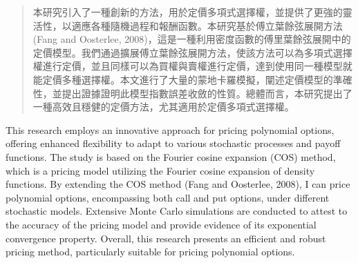 
\begin{abstract}

本研究引入了一種創新的方法，用於定價多項式選擇權，並提供了更強的靈活性，以適應各種隨機過程和報酬函數。本研究基於傅立葉餘弦展開方法 (Fang and Oosterlee, 2008)，這是一種利用密度函數的傅里葉餘弦展開中的定價模型。我們通過擴展傅立葉餘弦展開方法，使該方法可以為多項式選擇權進行定價，並且同樣可以為買權與賣權進行定價，達到使用同一種模型就能定價多種選擇權。本文進行了大量的蒙地卡羅模擬，闡述定價模型的準確性，並提出證據證明此模型指數誤差收斂的性質。總體而言，本研究提出了一種高效且穩健的定價方法，尤其適用於定價多項式選擇權。

\end{abstract}

\begin{abstract*}

This research employs an innovative approach for pricing polynomial options, offering enhanced flexibility to adapt to various stochastic processes and payoff functions. The study is based on the Fourier cosine expansion (COS) method, which is a pricing model utilizing the Fourier cosine expansion of density functions. By extending the COS method (Fang and Oosterlee, 2008), I can price polynomial options, encompassing both call and put options, under different stochastic models. Extensive Monte Carlo simulations are conducted to attest to the accuracy of the pricing model and provide evidence of its exponential convergence property. Overall, this research presents an efficient and robust pricing method, particularly suitable for pricing polynomial options.

\end{abstract*}